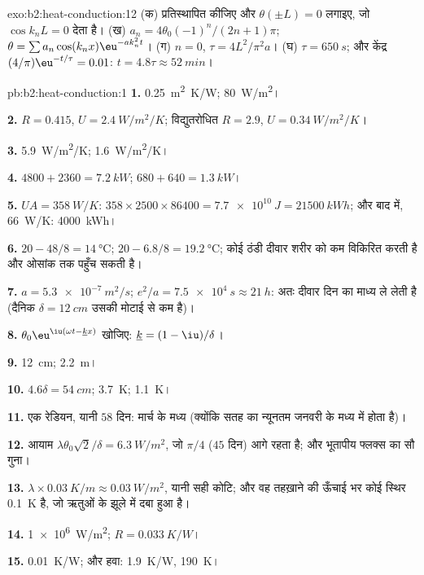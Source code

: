 \begin{solution}{exo:b2:heat-conduction:12}
(क) प्रतिस्थापित कीजिए और $\theta(\pm L) = 0$ लगाइए, जो $\cos k_nL = 0$ देता है। (ख) $a_n =
4\theta_0(-1)^n/(2n+1)\pi$; $\theta = \sum a_n\cos(k_nx)\eu^{-ak_n^2t}$। (ग) $n = 0$,
$\tau = 4L^2/\pi^2a$। (घ) $\tau = \qty{650}{s}$; और केंद्र $(4/\pi)\eu^{-t/\tau} = 0.01$:
$t = 4.8\tau \approx \qty{52}{min}$।
\end{solution}

\begin{solution}{pb:b2:heat-conduction:1}
\textbf{1.} \qty{0.25}{m^2.K/W}; \qty{80}{W/m^2}।

\textbf{2.} $R = 0.415$, $U = \qty{2.4}{W/m^2/K}$; विद्युतरोधित $R = 2.9$, $U =
\qty{0.34}{W/m^2/K}$।

\textbf{3.} \qty{5.9}{W/m^2/K}; \qty{1.6}{W/m^2/K}।

\textbf{4.} $4800 + 2360 = \qty{7.2}{kW}$; $680 + 640 = \qty{1.3}{kW}$।

\textbf{5.} $UA = \qty{358}{W/K}$: $358 \times 2500 \times 86400 = \qty{7.7e10}{J} =
\qty{21500}{kWh}$; और बाद में, \qty{66}{W/K}: \qty{4000}{kWh}।

\textbf{6.} $20 - 48/8 = \qty{14}{\celsius}$; $20 - 6.8/8 = \qty{19.2}{\celsius}$;
कोई ठंडी दीवार शरीर को कम विकिरित करती है और ओसांक तक पहुँच सकती है।

\textbf{7.} $a = \qty{5.3e-7}{m^2/s}$; $e^2/a = \qty{7.5e4}{s} \approx \qty{21}{h}$: अतः
दीवार दिन का माध्य ले लेती है (दैनिक $\delta = \qty{12}{cm}$ उसकी मोटाई से
कम है)।

\textbf{8.} $\theta_0\eu^{\iu(\omega t - \underline kx)}$ खोजिए: $\underline k = (1 - \iu)/\delta$।

\textbf{9.} \qty{12}{cm}; \qty{2.2}{m}।

\textbf{10.} $4.6\delta = \qty{54}{cm}$; \qty{3.7}{K}; \qty{1.1}{K}।

\textbf{11.} एक रेडियन, यानी $58$ दिन: मार्च के मध्य (क्योंकि सतह का न्यूनतम
जनवरी के मध्य में होता है)।

\textbf{12.} आयाम $\lambda\theta_0\sqrt2/\delta = \qty{6.3}{W/m^2}$, जो
$\pi/4$ ($45$ दिन) आगे रहता है; और भूतापीय फ्लक्स का सौ गुना।

\textbf{13.} $\lambda \times \qty{0.03}{K/m} \approx \qty{0.03}{W/m^2}$, यानी सही कोटि; और वह
तहख़ाने की ऊँचाई भर कोई स्थिर \qty{0.1}{K} है, जो
ऋतुओं के झूले में दबा हुआ है।

\textbf{14.} \qty{1e6}{W/m^2}; $R = \qty{0.033}{K/W}$।

\textbf{15.} \qty{0.01}{K/W}; और हवा: \qty{1.9}{K/W}, \qty{190}{K}।


\end{solution}
